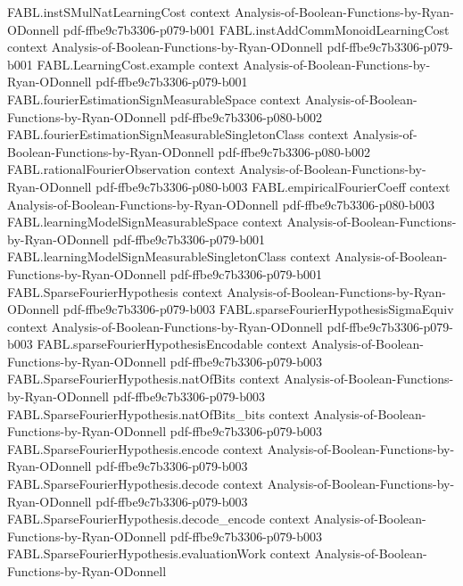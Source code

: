 \begin{theorem}
\proofstep
  {FABL.instSMulNatLearningCost}
  {context}
  {Analysis-of-Boolean-Functions-by-Ryan-ODonnell}
  {pdf-ffbe9c7b3306-p079-b001}
\proofstep
  {FABL.instAddCommMonoidLearningCost}
  {context}
  {Analysis-of-Boolean-Functions-by-Ryan-ODonnell}
  {pdf-ffbe9c7b3306-p079-b001}
\proofstep
  {FABL.LearningCost.example}
  {context}
  {Analysis-of-Boolean-Functions-by-Ryan-ODonnell}
  {pdf-ffbe9c7b3306-p079-b001}
\proofstep
  {FABL.fourierEstimationSignMeasurableSpace}
  {context}
  {Analysis-of-Boolean-Functions-by-Ryan-ODonnell}
  {pdf-ffbe9c7b3306-p080-b002}
\proofstep
  {FABL.fourierEstimationSignMeasurableSingletonClass}
  {context}
  {Analysis-of-Boolean-Functions-by-Ryan-ODonnell}
  {pdf-ffbe9c7b3306-p080-b002}
\proofstep
  {FABL.rationalFourierObservation}
  {context}
  {Analysis-of-Boolean-Functions-by-Ryan-ODonnell}
  {pdf-ffbe9c7b3306-p080-b003}
\proofstep
  {FABL.empiricalFourierCoeff}
  {context}
  {Analysis-of-Boolean-Functions-by-Ryan-ODonnell}
  {pdf-ffbe9c7b3306-p080-b003}
\proofstep
  {FABL.learningModelSignMeasurableSpace}
  {context}
  {Analysis-of-Boolean-Functions-by-Ryan-ODonnell}
  {pdf-ffbe9c7b3306-p079-b001}
\proofstep
  {FABL.learningModelSignMeasurableSingletonClass}
  {context}
  {Analysis-of-Boolean-Functions-by-Ryan-ODonnell}
  {pdf-ffbe9c7b3306-p079-b001}
\proofstep
  {FABL.SparseFourierHypothesis}
  {context}
  {Analysis-of-Boolean-Functions-by-Ryan-ODonnell}
  {pdf-ffbe9c7b3306-p079-b003}
\proofstep
  {FABL.sparseFourierHypothesisSigmaEquiv}
  {context}
  {Analysis-of-Boolean-Functions-by-Ryan-ODonnell}
  {pdf-ffbe9c7b3306-p079-b003}
\proofstep
  {FABL.sparseFourierHypothesisEncodable}
  {context}
  {Analysis-of-Boolean-Functions-by-Ryan-ODonnell}
  {pdf-ffbe9c7b3306-p079-b003}
\proofstep
  {FABL.SparseFourierHypothesis.natOfBits}
  {context}
  {Analysis-of-Boolean-Functions-by-Ryan-ODonnell}
  {pdf-ffbe9c7b3306-p079-b003}
\proofstep
  {FABL.SparseFourierHypothesis.natOfBits_bits}
  {context}
  {Analysis-of-Boolean-Functions-by-Ryan-ODonnell}
  {pdf-ffbe9c7b3306-p079-b003}
\proofstep
  {FABL.SparseFourierHypothesis.encode}
  {context}
  {Analysis-of-Boolean-Functions-by-Ryan-ODonnell}
  {pdf-ffbe9c7b3306-p079-b003}
\proofstep
  {FABL.SparseFourierHypothesis.decode}
  {context}
  {Analysis-of-Boolean-Functions-by-Ryan-ODonnell}
  {pdf-ffbe9c7b3306-p079-b003}
\proofstep
  {FABL.SparseFourierHypothesis.decode_encode}
  {context}
  {Analysis-of-Boolean-Functions-by-Ryan-ODonnell}
  {pdf-ffbe9c7b3306-p079-b003}
\proofstep
  {FABL.SparseFourierHypothesis.evaluationWork}
  {context}
  {Analysis-of-Boolean-Functions-by-Ryan-ODonnell}

\end{theorem}

